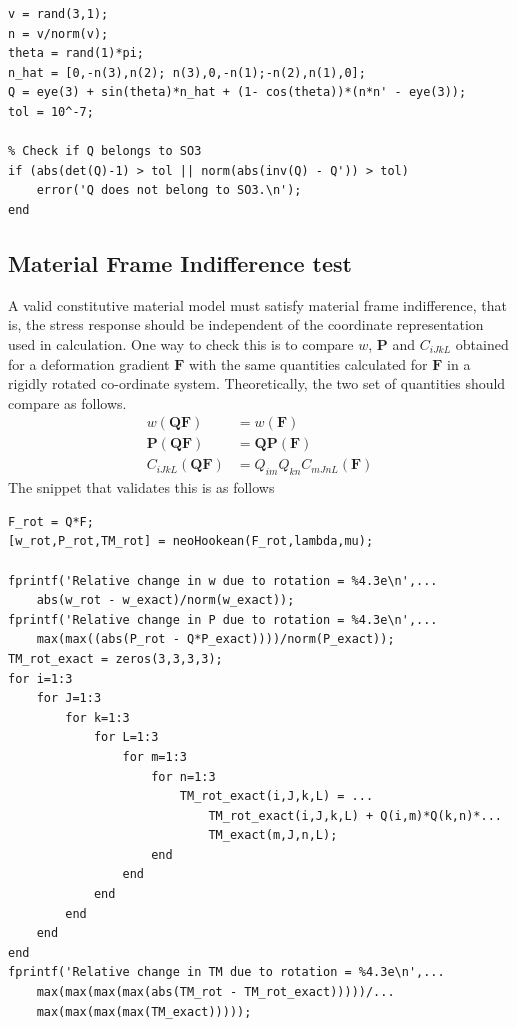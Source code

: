 \message{ !name(p2.tex)}\documentclass[../main.tex]{subfiles}
\begin{document}
\begin{lstlisting}[style = Matlab-editor]
v = rand(3,1);
n = v/norm(v);
theta = rand(1)*pi;
n_hat = [0,-n(3),n(2); n(3),0,-n(1);-n(2),n(1),0];
Q = eye(3) + sin(theta)*n_hat + (1- cos(theta))*(n*n' - eye(3));
tol = 10^-7;

% Check if Q belongs to SO3
if (abs(det(Q)-1) > tol || norm(abs(inv(Q) - Q')) > tol)
    error('Q does not belong to SO3.\n');
end
\end{lstlisting}

\subsection{Material Frame Indifference test}
\label{sec:mfi}
A valid constitutive material model must satisfy material frame
indifference, that is, the stress response should be independent of
the coordinate representation used in calculation. One way to check
this is to compare $w$, $\mathbf{P}$ and $C_{iJkL}$ obtained for a
deformation gradient $\mathbf{F}$ with the same quantities calculated
for $\mathbf{F}$ in a rigidly rotated co-ordinate
system. Theoretically, the two set of quantities should compare as
follows.
\begin{align*}
  w(\mathbf{QF}) &= w(\mathbf{F})\\
  \mathbf{P}(\mathbf{QF}) &= \mathbf{Q}\mathbf{P}(\mathbf{F})\\
  C_{iJkL}(\mathbf{QF}) &= Q_{im}Q_{kn}C_{mJnL}(\mathbf{F})
\end{align*}
The snippet that validates this is as follows
\begin{lstlisting}[style=Matlab-editor]
%% Checking Material Frame Indifference
F_rot = Q*F;
[w_rot,P_rot,TM_rot] = neoHookean(F_rot,lambda,mu);

fprintf('Relative change in w due to rotation = %4.3e\n',...
    abs(w_rot - w_exact)/norm(w_exact));
fprintf('Relative change in P due to rotation = %4.3e\n',...
    max(max((abs(P_rot - Q*P_exact))))/norm(P_exact));
TM_rot_exact = zeros(3,3,3,3);
for i=1:3
    for J=1:3
        for k=1:3
            for L=1:3
                for m=1:3
                    for n=1:3
                        TM_rot_exact(i,J,k,L) = ...
                            TM_rot_exact(i,J,k,L) + Q(i,m)*Q(k,n)*...
                            TM_exact(m,J,n,L);
                    end
                end
            end
        end
    end
end
fprintf('Relative change in TM due to rotation = %4.3e\n',...
    max(max(max(max(abs(TM_rot - TM_rot_exact)))))/...
    max(max(max(max(TM_exact)))));
\end{lstlisting}
\end{document}
